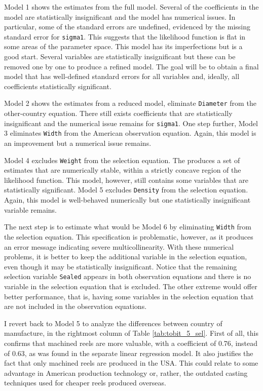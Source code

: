 \documentclass[11pt]{paper}
\begin{document}
Model 1 shows the estimates from the full model. 
Several of the coefficients in the model are 
statistically insignificant and the model has numerical issues.
In particular, some of the standard errors are undefined,
evidenced by the missing standard error for \texttt{sigma1}.
This suggests that the likelihood function is flat in some areas
of the parameter space.
%
This model has its imperfections but is a good start.
Several variables are statistically insignificant
but these can be removed one by one
to produce a refined model.
%
The goal will be to obtain a final model that has
well-defined standard errors for all variables
and, ideally, all coefficients statistically significant.


Model 2 shows the estimates from a reduced model,
eliminate \texttt{Diameter} from the other-country equation.
There still exists coefficients that are statistically insignificant
and the numerical issue remains for \texttt{sigma1}. 
One step further, Model 3
eliminates \texttt{Width} from the American observation equation.
Again, this model is an improvement but a numerical issue remains. 

Model 4 excludes \texttt{Weight} from the selection equation.
The produces a set of estimates that are numerically stable, 
within a strictly concave region of the likelihood function. 
This model, however, still contains
some variables that are statistically significant.
Model 5 excludes \texttt{Density} from the selection equation.
Again, this model is well-behaved numerically
but one statistically insignificant variable remains.

The next step is to estimate what would be Model 6
by eliminating \texttt{Width} from the selection equation.
This specification is problematic, however, 
as it produces an error message indicating severe multicollinearity. 
% 
With these numerical problems,
it is better to keep the additional variable
in the selection equation,
even though it may be statistically insignificant.
Notice that the remaining selection variable \texttt{Sealed}
appears in both observation equations and there is no
variable in the selection equation that is excluded.
The other extreme would offer better performance,
that is, having some variables in the selection
equation that are not included in the observation equations.




\pagebreak

I revert back to Model 5 to analyze the differences
between country of manufacture, 
in the rightmost column of Table \ref{tab:tobit_5_sel}.
% 
First of all, this confirms that machined reels
are more valuable, with a coefficient of 0.76, instead of 0.63,
as was found in the separate linear regression model.
It also justifies the fact that only machined reels
are produced in the USA.
This could relate to some advantage in American production
technology or, rather, the outdated casting techniques
used for cheaper reels produced overseas.
\end{document}
